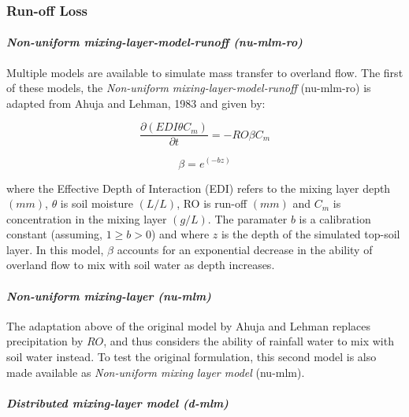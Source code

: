\documentclass[]{article}
\let\oldparagraph\paragraph
\renewcommand{\paragraph}[1]{\oldparagraph{#1}\mbox{}}
\begin{document}
\subsubsection{Run-off Loss}\label{run-off-loss}

\paragraph{\texorpdfstring{\textit{Non-uniform mixing-layer-model-runoff (nu-mlm-ro)}}{}}\label{section}

Multiple models are available to simulate mass transfer to overland
flow. The first of these models, the
\textit{Non-uniform mixing-layer-model-runoff} (nu-mlm-ro) is adapted
from Ahuja and Lehman, 1983 \citep[see][eq. 1 and p.~1217]{Shi2011} and
given by:

\begin{equation}
\frac{\partial (EDI \theta C_m)}{\partial t} = -RO \beta C_m
\label{eq:nu-mlm-ro}
\end{equation}

\begin{equation}
\beta = e^{(-bz)}
\label{eq:beta-nu-mlm}
\end{equation}

where the Effective Depth of Interaction (EDI) refers to the mixing
layer depth \((mm)\), \(\theta\) is soil moisture \((L/L)\), RO is
run-off \((mm)\) and \(C_m\) is concentration in the mixing layer
\((g/L)\). The paramater \(b\) is a calibration constant (assuming,
\(1 \ge b > 0\)) and where \(z\) is the depth of the simulated top-soil
layer. In this model, \(\beta\) accounts for an exponential decrease in
the ability of overland flow to mix with soil water as depth increases.

\paragraph{\texorpdfstring{\textit{Non-uniform mixing-layer (nu-mlm)}}{}}\label{section-1}

The adaptation above of the original model by Ahuja and Lehman replaces
precipitation by \(RO\), and thus considers the ability of rainfall
water to mix with soil water instead. To test the original formulation,
this second model is also made available as
\textit{Non-uniform mixing layer model} (nu-mlm).

\paragraph{\texorpdfstring{\textit{Distributed mixing-layer model (d-mlm)}}{}}\label{section-2}
\end{document}
